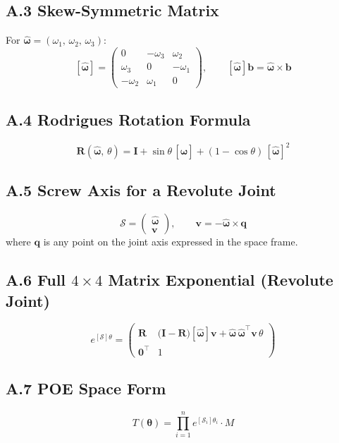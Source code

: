 \documentclass[12pt,a4paper]{article}
\newcommand{\vect}[1]{\bm{#1}}
\newcommand{\mat}[1]{\mathbf{#1}}
\begin{document}
\subsection*{A.3 \quad Skew-Symmetric Matrix}
For $\vect{\hat\omega} = (\omega_1,\,\omega_2,\,\omega_3)$:
\[
  [\vect{\hat\omega}]
  = \begin{pmatrix}
      0        & -\omega_3 &  \omega_2 \\
      \omega_3 &  0        & -\omega_1 \\
     -\omega_2 &  \omega_1 &  0
    \end{pmatrix},
  \qquad
  [\vect{\hat\omega}]\vect{b} = \vect{\hat\omega}\times\vect{b}
\]

\subsection*{A.4 \quad Rodrigues Rotation Formula}
\[
  \mat{R}(\vect{\hat\omega},\,\theta)
  = \mat{I} + \sin\theta\,[\vect{\hat\omega}] + (1-\cos\theta)\,[\vect{\hat\omega}]^2
\]

\subsection*{A.5 \quad Screw Axis for a Revolute Joint}
\[
  \mathcal{S} = \begin{pmatrix}\vect{\hat\omega}\\\vect{v}\end{pmatrix},
  \qquad
  \vect{v} = -\vect{\hat\omega} \times \vect{q}
\]
where $\vect{q}$ is any point on the joint axis expressed in the space frame.

\subsection*{A.6 \quad Full $4\times4$ Matrix Exponential (Revolute Joint)}
\[
  e^{[\mathcal{S}]\theta}
  = \begin{pmatrix}
      \mat{R} &
      \bigl(\mat{I}-\mat{R}\bigr)[\vect{\hat\omega}]\vect{v}
      + \vect{\hat\omega}\,\vect{\hat\omega}^\top\vect{v}\,\theta \\
      \vect{0}^\top & 1
    \end{pmatrix}
\]

\subsection*{A.7 \quad POE Space Form}
\[
  T(\vect{\theta})
  = \prod_{i=1}^{n} e^{[\mathcal{S}_i]\theta_i} \cdot M
\]
\end{document}
